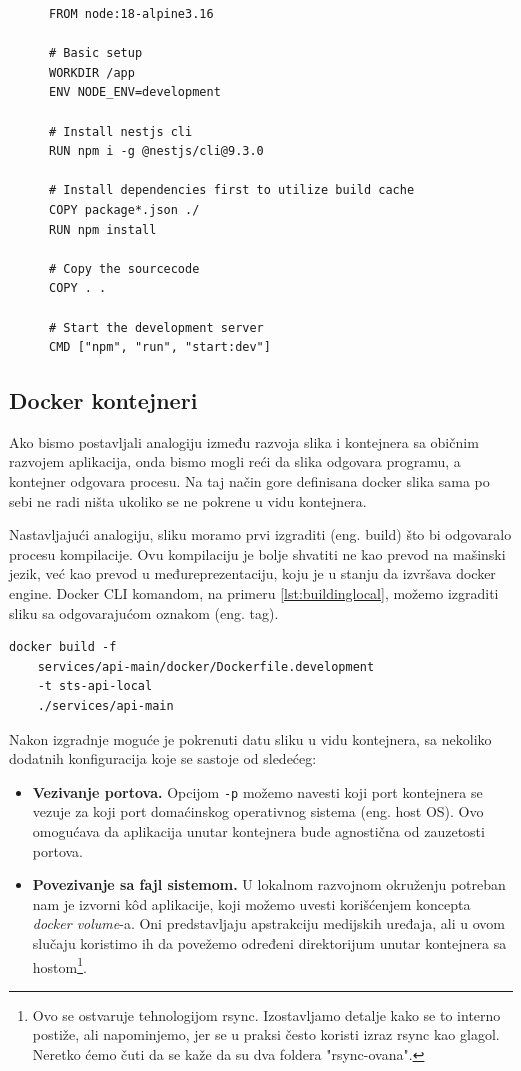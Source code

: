 \documentclass[12pt,oneside]{memoir}
\begin{document}
\begin{figure}[h]
\begin{lstlisting}[language=docker, caption={Slika za bekend server}, label={lst:dockerimgbackendexample}]
FROM node:18-alpine3.16

# Basic setup
WORKDIR /app
ENV NODE_ENV=development

# Install nestjs cli
RUN npm i -g @nestjs/cli@9.3.0

# Install dependencies first to utilize build cache
COPY package*.json ./
RUN npm install

# Copy the sourcecode
COPY . .

# Start the development server
CMD ["npm", "run", "start:dev"]
\end{lstlisting}
\end{figure}

\subsection{Docker kontejneri}

Ako bismo postavljali analogiju između razvoja slika i kontejnera sa običnim razvojem aplikacija, onda bismo mogli reći da slika odgovara programu, a kontejner odgovara procesu. Na taj način gore definisana docker slika sama po sebi ne radi ništa ukoliko se ne pokrene u vidu kontejnera. 

Nastavljajući analogiju, sliku moramo prvi izgraditi (eng. build) što bi odgovaralo procesu kompilacije. Ovu kompilaciju je bolje shvatiti ne kao prevod na mašinski jezik, već kao prevod u međureprezentaciju, koju je u stanju da izvršava docker engine. Docker CLI komandom, na primeru \ref{lst:buildinglocal}, možemo izgraditi sliku sa odgovarajućom oznakom (eng. tag).

\newpage
\begin{lstlisting}[caption={Izgradnja slike}, label={lst:buildinglocal}]
docker build -f
    services/api-main/docker/Dockerfile.development 
    -t sts-api-local 
    ./services/api-main 
\end{lstlisting}

Nakon izgradnje moguće je pokrenuti datu sliku u vidu kontejnera, sa nekoliko dodatnih konfiguracija koje se sastoje od sledećeg:
\begin{itemize}
    \item \textbf{Vezivanje portova.} Opcijom \verb|-p| možemo navesti koji port kontejnera se vezuje za koji port domaćinskog operativnog sistema (eng. host OS). Ovo omogućava da aplikacija unutar kontejnera bude agnostična od zauzetosti portova.
    \item \textbf{Povezivanje sa fajl sistemom.} U lokalnom razvojnom okruženju potreban nam je izvorni k\^{o}d aplikacije, koji možemo uvesti korišćenjem koncepta \textit{docker volume}-a. Oni predstavljaju apstrakciju medijskih uređaja, ali u ovom slučaju koristimo ih da povežemo određeni direktorijum unutar kontejnera sa hostom\footnote{Ovo se ostvaruje tehnologijom rsync. Izostavljamo detalje kako se to interno postiže, ali napominjemo, jer se u praksi često koristi izraz rsync kao glagol. Neretko ćemo čuti da se kaže da su dva foldera "rsync-ovana".}.
\end{itemize}
\end{document}
